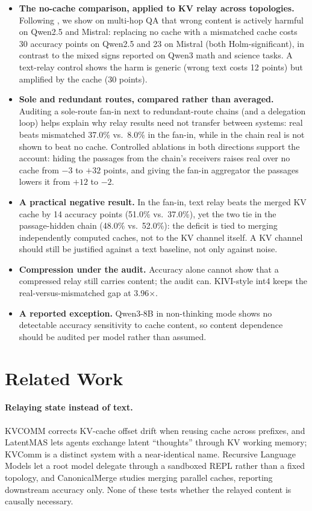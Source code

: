\documentclass[11pt]{article}
\begin{document}
\begin{itemize}[leftmargin=*,itemsep=2pt,topsep=2pt]
\item \textbf{The no-cache comparison, applied to KV relay across topologies.}
Following \citet{zhangemu2026}, we show on multi-hop QA that wrong content is
actively harmful on Qwen2.5 and Mistral: replacing no cache with a mismatched
cache costs 30 accuracy points on Qwen2.5 and 23 on Mistral (both
Holm-significant), in contrast to the mixed signs reported on Qwen3 math and
science tasks. A text-relay control shows the harm is generic (wrong text costs 12
points) but amplified by the cache (30 points).
\item \textbf{Sole and redundant routes, compared rather than averaged.} Auditing
a sole-route fan-in next to redundant-route chains (and a delegation loop) helps
explain why relay results need not transfer between systems: real beats
mismatched 37.0\% vs.\ 8.0\% in the fan-in, while in the chain real is not shown
to beat no cache. Controlled ablations in both directions support the account:
hiding the passages from the chain's receivers raises real over no cache from $-3$
to $+32$ points, and giving the fan-in aggregator the passages lowers it from $+12$
to $-2$.
\item \textbf{A practical negative result.} In the fan-in, text relay beats the
merged KV cache by 14 accuracy points (51.0\% vs.\ 37.0\%), yet the two tie in the
passage-hidden chain (48.0\% vs.\ 52.0\%): the deficit is tied to merging
independently computed caches, not to the KV channel itself. A KV channel should
still be justified against a text baseline, not only against noise.
\item \textbf{Compression under the audit.} Accuracy alone cannot show that a
compressed relay still carries content; the audit can. KIVI-style int4 keeps the
real-versus-mismatched gap at 3.96$\times$.
\item \textbf{A reported exception.} Qwen3-8B in non-thinking mode shows no
detectable accuracy sensitivity to cache content, so content dependence should be
audited per model rather than assumed.
\end{itemize}

\section{Related Work}
\label{sec:related}

\paragraph{Relaying state instead of text.} KVCOMM \citep{kvcomm2025}
corrects KV-cache offset drift when reusing cache across prefixes, and
LatentMAS \citep{latentmas2026} lets agents exchange latent ``thoughts''
through KV working memory; KVComm \citep{shikvcomm2025} is a distinct
system with a near-identical name. Recursive Language Models
\citep{rlm2026} let a root model delegate through a sandboxed REPL
rather than a fixed topology, and CanonicalMerge
\citep{canonicalmerge2026} studies merging parallel caches, reporting
downstream accuracy only. None of these tests whether the relayed
content is causally necessary.
\end{document}
